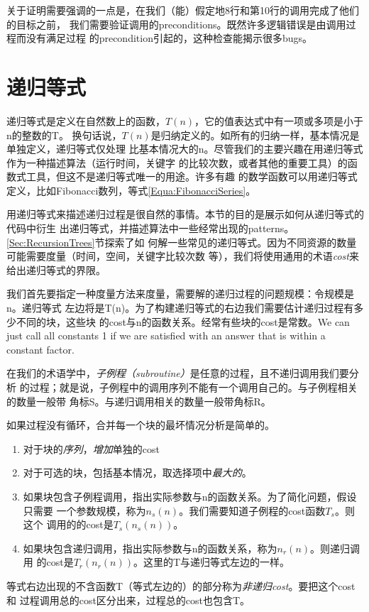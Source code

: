 关于证明需要强调的一点是，在我们（能）假定地8行和第10行的调用完成了他们的目标之前，
我们需要验证调用的preconditions。既然许多逻辑错误是由调用过程而没有满足过程
的precondition引起的，这种检查能揭示很多bugs。

\section{递归等式}\label{Sec:RecursiveEquation}
递归等式是定义在自然数上的函数，$T(n)$，它的值表达式中有一项或多项是小于n的整数的T。
换句话说，$T(n)$是归纳定义的。如所有的归纳一样，基本情况是单独定义，递归等式仅处理
比基本情况大的n。尽管我们的主要兴趣在用递归等式作为一种描述算法（运行时间，关键字
的比较次数，或者其他的重要工具）的函数式工具，但这不是递归等式唯一的用途。许多有趣
的数学函数可以用递归等式定义，比如Fibonacci数列，等式\ref{Equa:FibonacciSeries}。

用递归等式来描述递归过程是很自然的事情。本节的目的是展示如何从递归等式的代码中衍生
出递归等式，并描述算法中一些经常出现的patterns。\ref{Sec:RecursionTrees}节探索了如
何解一些常见的递归等式。因为不同资源的数量可能需要度量（时间，空间，关键字比较次数
等），我们将使用通用的术语\emph{cost}来给出递归等式的界限。

我们首先要指定一种度量方法来度量，需要解的递归过程的问题规模：令规模是n。递归等式
左边将是T(n)。为了构建递归等式的右边我们需要估计递归过程有多少不同的块，这些块
的cost与n的函数关系。经常有些块的cost是常数。We can just call all constants 1
if we are satisfied with an answer that is within a constant factor.

在我们的术语学中，\emph{子例程（subroutine）}是任意的过程，且不递归调用我们要分析
的过程；就是说，子例程中的调用序列不能有一个调用自己的。与子例程相关的数量一般带
角标S。与递归调用相关的数量一般带角标R。

如果过程没有循环，合并每一个块的最坏情况分析是简单的。
\begin{enumerate}
\item 对于块的\emph{序列}，\emph{增加}单独的cost
\item 对于可选的块，包括基本情况，取选择项中\emph{最大的}。
\item 如果块包含子例程调用，指出实际参数与n的函数关系。为了简化问题，假设只需要
        一个参数规模，称为$n_s(n)$。我们需要知道子例程的cost函数$T_s$。则这个
        调用的的cost是$T_s(n_s(n))$。
\item 如果块包含递归调用，指出实际参数与n的函数关系，称为$n_r(n)$。则递归调用
        的cost是$T_r(n_r(n))$。这里的T与递归等式左边的一样。
\end{enumerate}
\noindent
等式右边出现的不含函数T（等式左边的）的部分称为\emph{非递归cost}。要把这个cost和
过程调用总的cost区分出来，过程总的cost也包含T。

